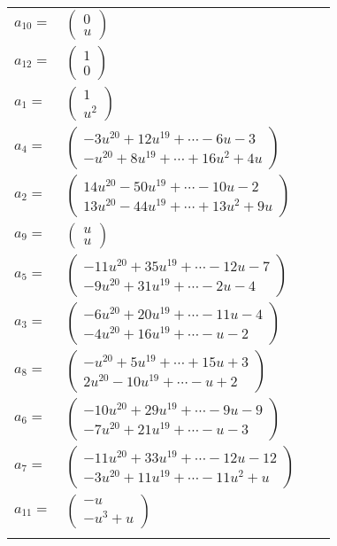 \documentclass[1p]{elsarticle_modified}
\theoremstyle{definition}
\begin{document}
\begin{tabular}{m{7pt} m{180pt} m{7pt} m{180pt} }
\flushright $a_{10}=$&$\begin{pmatrix}0\\u\end{pmatrix}$ \\
\flushright $a_{12}=$&$\begin{pmatrix}1\\0\end{pmatrix}$ \\
\flushright $a_{1}=$&$\begin{pmatrix}1\\u^2\end{pmatrix}$ \\
\flushright $a_{4}=$&$\begin{pmatrix}-3 u^{20}+12 u^{19}+\cdots-6 u-3\\- u^{20}+8 u^{19}+\cdots+16 u^2+4 u\end{pmatrix}$ \\
\flushright $a_{2}=$&$\begin{pmatrix}14 u^{20}-50 u^{19}+\cdots-10 u-2\\13 u^{20}-44 u^{19}+\cdots+13 u^2+9 u\end{pmatrix}$ \\
\flushright $a_{9}=$&$\begin{pmatrix}u\\u\end{pmatrix}$ \\
\flushright $a_{5}=$&$\begin{pmatrix}-11 u^{20}+35 u^{19}+\cdots-12 u-7\\-9 u^{20}+31 u^{19}+\cdots-2 u-4\end{pmatrix}$ \\
\flushright $a_{3}=$&$\begin{pmatrix}-6 u^{20}+20 u^{19}+\cdots-11 u-4\\-4 u^{20}+16 u^{19}+\cdots- u-2\end{pmatrix}$ \\
\flushright $a_{8}=$&$\begin{pmatrix}- u^{20}+5 u^{19}+\cdots+15 u+3\\2 u^{20}-10 u^{19}+\cdots- u+2\end{pmatrix}$ \\
\flushright $a_{6}=$&$\begin{pmatrix}-10 u^{20}+29 u^{19}+\cdots-9 u-9\\-7 u^{20}+21 u^{19}+\cdots- u-3\end{pmatrix}$ \\
\flushright $a_{7}=$&$\begin{pmatrix}-11 u^{20}+33 u^{19}+\cdots-12 u-12\\-3 u^{20}+11 u^{19}+\cdots-11 u^2+u\end{pmatrix}$ \\
\flushright $a_{11}=$&$\begin{pmatrix}- u\\- u^3+u\end{pmatrix}$\\&\end{tabular}
\end{document}
